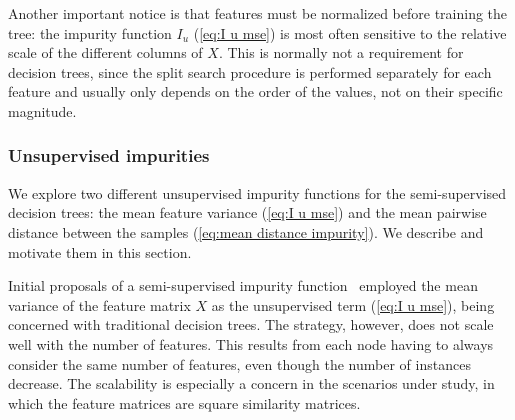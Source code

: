 Another important notice is that features must be normalized before training the tree: the impurity function $I_u$ (\autoref{eq:I u mse}) is most often sensitive to the relative scale of the different columns of $X$. This is normally not a requirement for decision trees, since the split search procedure is performed separately for each feature and usually only depends on the order of the values, not on their specific magnitude.


\subsubsection{Unsupervised impurities}
\label{sec:Iu}

We explore two different unsupervised impurity functions for the semi-supervised decision trees: the mean feature variance (\autoref{eq:I u mse}) and the mean pairwise distance between the samples (\autoref{eq:mean distance impurity}). We describe and motivate them in this section.

Initial proposals of a semi-supervised impurity function~\cite{levatic2017semisupervised} employed the mean variance of the feature matrix $X$ as the unsupervised term (\autoref{eq:I u mse}), being concerned with traditional decision trees.
The strategy, however, does not scale well with the number of features.
This results from each node having to always consider the same number of features, even though the number of instances decrease.
The scalability is especially a concern in the scenarios under study, in which the feature matrices are square similarity matrices.


